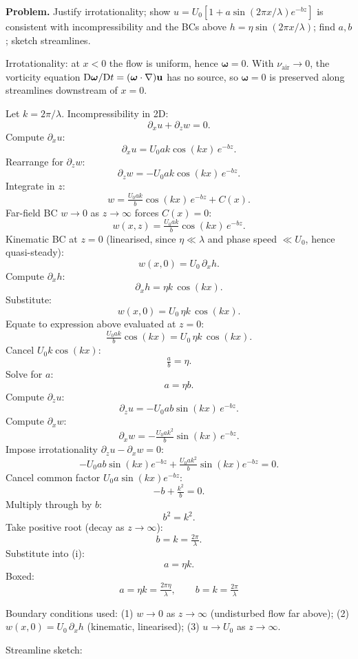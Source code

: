 \documentclass[11pt]{article}
\newcommand{\D}{\mathrm{D}}
\begin{document}
\textbf{Problem.} Justify irrotationality; show $u = U_0[1 + a\sin(2\pi x/\lambda)e^{-bz}]$ is consistent with incompressibility and the BCs above $h = \eta\sin(2\pi x/\lambda)$; find $a, b$; sketch streamlines.

Irrotationality: at $x<0$ the flow is uniform, hence $\bm\omega=0$. With $\nu_\text{air}\to 0$, the vorticity equation $\D\bm\omega/\D t = (\bm\omega\cdot\nabla)\vb u$ has no source, so $\bm\omega = 0$ is preserved along streamlines downstream of $x=0$.

Let $k = 2\pi/\lambda$. Incompressibility in 2D:
\[
\partial_x u + \partial_z w = 0.
\]
Compute $\partial_x u$:
\[
\partial_x u = U_0 a k \cos(kx)\,e^{-bz}.
\]
Rearrange for $\partial_z w$:
\[
\partial_z w = -U_0 a k \cos(kx)\,e^{-bz}.
\]
Integrate in $z$:
\[
w = \tfrac{U_0 a k}{b}\cos(kx)\,e^{-bz} + C(x).
\]
Far-field BC $w\to 0$ as $z\to\infty$ forces $C(x) = 0$:
\[
w(x,z) = \tfrac{U_0 a k}{b}\cos(kx)\,e^{-bz}.
\]
Kinematic BC at $z=0$ (linearised, since $\eta\ll\lambda$ and phase speed $\ll U_0$, hence quasi-steady):
\[
w(x,0) = U_0\,\partial_x h.
\]
Compute $\partial_x h$:
\[
\partial_x h = \eta k\,\cos(kx).
\]
Substitute:
\[
w(x,0) = U_0\,\eta k\,\cos(kx).
\]
Equate to expression above evaluated at $z=0$:
\[
\tfrac{U_0 a k}{b}\cos(kx) = U_0\,\eta k\,\cos(kx).
\]
Cancel $U_0 k\cos(kx)$:
\[
\tfrac{a}{b} = \eta.
\]
Solve for $a$:
\[
a = \eta b. \tag{i}
\]
Compute $\partial_z u$:
\[
\partial_z u = -U_0 a b\sin(kx)\,e^{-bz}.
\]
Compute $\partial_x w$:
\[
\partial_x w = -\tfrac{U_0 a k^2}{b}\sin(kx)\,e^{-bz}.
\]
Impose irrotationality $\partial_z u - \partial_x w = 0$:
\[
-U_0 a b\sin(kx)e^{-bz} + \tfrac{U_0 a k^2}{b}\sin(kx)e^{-bz} = 0.
\]
Cancel common factor $U_0 a\sin(kx)e^{-bz}$:
\[
-b + \tfrac{k^2}{b} = 0.
\]
Multiply through by $b$:
\[
b^2 = k^2.
\]
Take positive root (decay as $z\to\infty$):
\[
b = k = \tfrac{2\pi}{\lambda}.
\]
Substitute into (i):
\[
a = \eta k.
\]
Boxed:
\[
\boxed{\;a = \eta k = \tfrac{2\pi\eta}{\lambda},\qquad b = k = \tfrac{2\pi}{\lambda}\;}
\]

Boundary conditions used: (1) $w\to 0$ as $z\to\infty$ (undisturbed flow far above); (2) $w(x,0) = U_0\,\partial_x h$ (kinematic, linearised); (3) $u\to U_0$ as $z\to\infty$.

Streamline sketch:

\begin{center}
\end{center}
\end{document}
